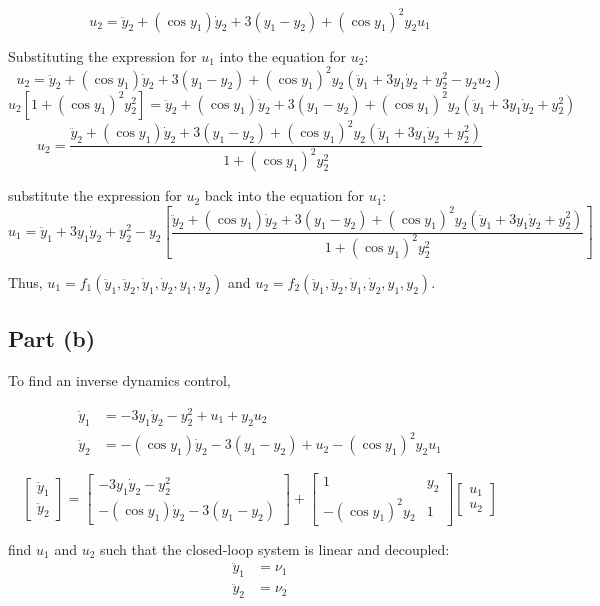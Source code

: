 \documentclass{article}
\begin{document}
\[
u_2 = \ddot{y}_2 + (\cos y_1)\dot{y}_2 + 3(y_1 - y_2) + (\cos y_1)^2 y_2 u_1
\]

Substituting the expression for $u_1$ into the equation for $u_2$:
\[
u_2 = \ddot{y}_2 + (\cos y_1)\dot{y}_2 + 3(y_1 - y_2) + (\cos y_1)^2 y_2 (\ddot{y}_1 + 3y_1\dot{y}_2 + y_2^2 - y_2 u_2)
\]
\[
u_2 [1 + (\cos y_1)^2 y_2^2] = \ddot{y}_2 + (\cos y_1)\dot{y}_2 + 3(y_1 - y_2) + (\cos y_1)^2 y_2 (\ddot{y}_1 + 3y_1\dot{y}_2 + y_2^2)
\]
\[
u_2 = \frac{\ddot{y}_2 + (\cos y_1)\dot{y}_2 + 3(y_1 - y_2) + (\cos y_1)^2 y_2 (\ddot{y}_1 + 3y_1\dot{y}_2 + y_2^2)}{1 + (\cos y_1)^2 y_2^2}
\]

substitute the expression for $u_2$ back into the equation for $u_1$:
\[
u_1 = \ddot{y}_1 + 3y_1\dot{y}_2 + y_2^2 - y_2 \left[ \frac{\ddot{y}_2 + (\cos y_1)\dot{y}_2 + 3(y_1 - y_2) + (\cos y_1)^2 y_2 (\ddot{y}_1 + 3y_1\dot{y}_2 + y_2^2)}{1 + (\cos y_1)^2 y_2^2} \right]
\]

Thus, $u_1 = f_1(\ddot{y}_1, \ddot{y}_2, \dot{y}_1, \dot{y}_2, y_1, y_2)$ and $u_2 = f_2(\ddot{y}_1, \ddot{y}_2, \dot{y}_1, \dot{y}_2, y_1, y_2)$.

\subsection{Part (b)}

To find an inverse dynamics control, 

\begin{align}
\ddot{y}_1 &= -3y_1\dot{y}_2 - y_2^2 + u_1 + y_2 u_2 \\
\ddot{y}_2 &= -(\cos y_1)\dot{y}_2 - 3(y_1 - y_2) + u_2 - (\cos y_1)^2 y_2 u_1
\end{align}

\[
\begin{bmatrix} \ddot{y}_1 \\ \ddot{y}_2 \end{bmatrix} = \begin{bmatrix} -3y_1\dot{y}_2 - y_2^2 \\ -(\cos y_1)\dot{y}_2 - 3(y_1 - y_2) \end{bmatrix} + \begin{bmatrix} 1 & y_2 \\ -(\cos y_1)^2 y_2 & 1 \end{bmatrix} \begin{bmatrix} u_1 \\ u_2 \end{bmatrix}
\]

find $u_1$ and $u_2$ such that the closed-loop system is linear and decoupled:
\begin{align}
\ddot{y}_1 &= \nu_1 \\
\ddot{y}_2 &= \nu_2
\end{align}
\end{document}
